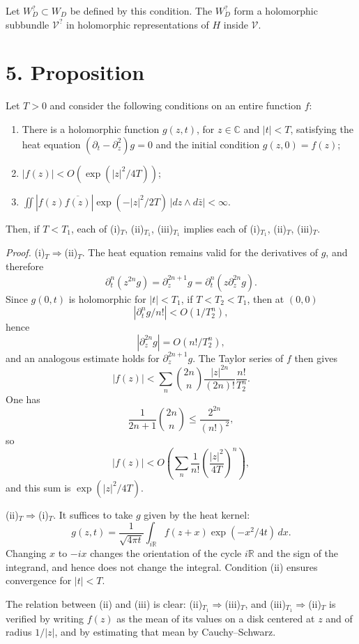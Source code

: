 \documentclass[12pt,a4paper]{article}
\theoremstyle{plain}
\theoremstyle{definition}
\theoremstyle{remark}
\begin{document}
Let $W_D^?\subset W_D$ be defined by this condition. The $W_D^?$ form a holomorphic subbundle $\mathscr V^?$ in holomorphic representations of $H$ inside $\mathscr V$.

\section*{5. Proposition}

Let $T>0$ and consider the following conditions on an entire function $f$:

\begin{enumerate}[label=(\roman*)$_T$]
\item There is a holomorphic function $g(z,t)$, for $z\in \mathbb C$ and $|t|<T$, satisfying the heat equation $(\partial_t-\partial_z^2)g=0$ and the initial condition $g(z,0)=f(z)$;
\item $|f(z)|<O(\exp(|z|^2/4T))$;
\item $\displaystyle\iint |f(z)\overline{f(z)}|\exp(-|z|^2/2T)\,|dz\wedge d\bar z|<\infty$.
\end{enumerate}

Then, if $T<T_1$, each of (i)$_T$, (ii)$_{T_1}$, (iii)$_{T_1}$ implies each of (i)$_{T_1}$, (ii)$_T$, (iii)$_T$.

\medskip
\noindent\textit{Proof.} (i)$_T\Rightarrow$(ii)$_T$. The heat equation remains valid for the derivatives of $g$, and therefore
\[
\partial_t^n(z^{2n}g)=\partial_z^{2n+1}g=\partial_t^n(z\partial_z^{2n}g).
\]
Since $g(0,t)$ is holomorphic for $|t|<T_1$, if $T<T_2<T_1$, then at $(0,0)$
\[
|\partial_t^n g/n!|<O(1/T_2^n),
\]
hence
\[
|\partial_z^{2n}g|=O(n!/T_2^n),
\]
and an analogous estimate holds for $\partial_z^{2n+1}g$. The Taylor series of $f$ then gives
\[
|f(z)|<\sum_n \binom{2n}{n}\frac{|z|^{2n}}{(2n)!}\frac{n!}{T_2^n}.
\]
One has
\[
\frac{1}{2n+1}\binom{2n}{n}\leq \frac{2^{2n}}{(n!)^2},
\]
so
\[
|f(z)|<O\left(\sum_n \frac{1}{n!}\left(\frac{|z|^2}{4T}\right)^n\right),
\]
and this sum is $\exp(|z|^2/4T)$.

(ii)$_T\Rightarrow$(i)$_T$. It suffices to take $g$ given by the heat kernel:
\[
g(z,t)=\frac{1}{\sqrt{4\pi t}}\int_{i\mathbb R} f(z+x)\exp(-x^2/4t)\,dx.
\]
Changing $x$ to $-ix$ changes the orientation of the cycle $i\mathbb R$ and the sign of the integrand, and hence does not change the integral. Condition (ii) ensures convergence for $|t|<T$.

The relation between (ii) and (iii) is clear: (ii)$_{T_1}\Rightarrow$(iii)$_T$, and (iii)$_{T_1}\Rightarrow$(ii)$_T$ is verified by writing $f(z)$ as the mean of its values on a disk centered at $z$ and of radius $1/|z|$, and by estimating that mean by Cauchy--Schwarz.
\end{document}
